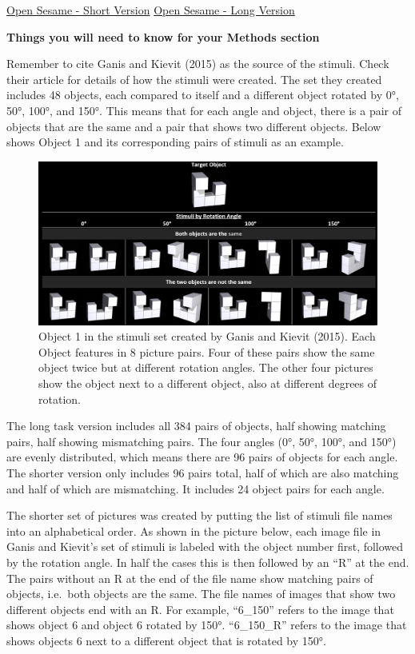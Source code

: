 \documentclass[
]{book}
\begin{document}
\href{GitHub/SpatialRotationShort.osexp}{Open Sesame - Short Version} \textbar{} \href{GitHub/SpatialRotationLong.osexp}{Open Sesame - Long Version}

\textbf{Things you will need to know for your Methods section}

Remember to cite Ganis and Kievit (2015) as the source of the stimuli. Check their article for details of how the stimuli were created. The set they created includes 48 objects, each compared to itself and a different object rotated by 0°, 50°, 100°, and 150°. This means that for each angle and object, there is a pair of objects that are the same and a pair that shows two different objects. Below shows Object 1 and its corresponding pairs of stimuli as an example.

\begin{figure}

{\centering \includegraphics[width=0.99\linewidth]{images/RotationOverview} 

}

\caption{Object 1 in the stimuli set created by Ganis and Kievit (2015). Each Object features in 8 picture pairs. Four of these pairs show the same object twice but at different rotation angles. The other four pictures show the object next to a different object, also at different degrees of rotation.}\label{fig:Figure5-2}
\end{figure}

The long task version includes all 384 pairs of objects, half showing matching pairs, half showing mismatching pairs. The four angles (0°, 50°, 100°, and 150°) are evenly distributed, which means there are 96 pairs of objects for each angle. The shorter version only includes 96 pairs total, half of which are also matching and half of which are mismatching. It includes 24 object pairs for each angle.

The shorter set of pictures was created by putting the list of stimuli file names into an alphabetical order. As shown in the picture below, each image file in Ganis and Kievit's set of stimuli is labeled with the object number first, followed by the rotation angle. In half the cases this is then followed by an ``R'' at the end. The pairs without an R at the end of the file name show matching pairs of objects, i.e.~both objects are the same. The file names of images that show two different objects end with an R. For example, ``6\_150'' refers to the image that shows object 6 and object 6 rotated by 150°. ``6\_150\_R'' refers to the image that shows objects 6 next to a different object that is rotated by 150°.
\end{document}
